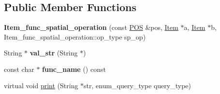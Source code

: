\subsection*{Public Member Functions}
\begin{DoxyCompactItemize}
\item 
\mbox{\label{classItem__func__spatial__operation_a31eb298e8ace503c71863edc9587776c}} 
{\bfseries Item\+\_\+func\+\_\+spatial\+\_\+operation} (const \mbox{\hyperlink{structYYLTYPE}{P\+OS}} \&pos, \mbox{\hyperlink{classItem}{Item}} $\ast$a, \mbox{\hyperlink{classItem}{Item}} $\ast$b, Item\+\_\+func\+\_\+spatial\+\_\+operation\+::op\+\_\+type sp\+\_\+op)
\item 
\mbox{\label{classItem__func__spatial__operation_a231acffd5ee83b8a0b348bc38d93816a}} 
String $\ast$ {\bfseries val\+\_\+str} (String $\ast$)
\item 
\mbox{\label{classItem__func__spatial__operation_a362575045914f7b5ef21f50cb5544758}} 
const char $\ast$ {\bfseries func\+\_\+name} () const
\item 
virtual void \mbox{\hyperlink{classItem__func__spatial__operation_ac7bb51665071406b92daf9728254fdfe}{print}} (String $\ast$str, enum\+\_\+query\+\_\+type query\+\_\+type)
\end{DoxyCompactItemize}
